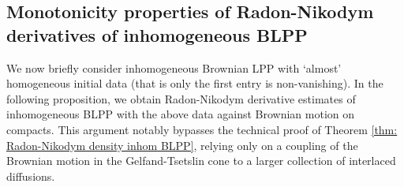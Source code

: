 \documentclass[11pt, reqno]{amsart}
\numberwithin{equation}{section}
\begin{document}
\subsection{Monotonicity properties of Radon-Nikodym derivatives of inhomogeneous BLPP}\label{subsec: monotonicity properties of RN of reflections}
We now briefly consider inhomogeneous Brownian LPP with `almost' homogeneous initial data (that is only the first entry is non-vanishing). In the following proposition, we obtain Radon-Nikodym derivative estimates of inhomogeneous BLPP with the above data against Brownian motion on compacts. This argument notably bypasses the technical proof of Theorem \ref{thm: Radon-Nikodym  density inhom BLPP}, relying only on a coupling of the Brownian motion in the Gelfand-Tsetslin cone to a larger collection of interlaced diffusions.  
\end{document}
